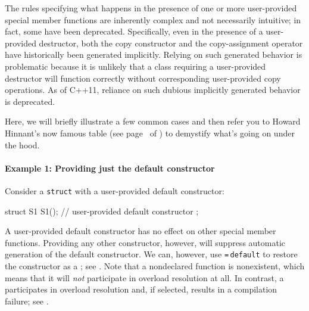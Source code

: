 The rules specifying what happens in the presence of one or more
user-provided special member functions are inherently complex and not
necessarily intuitive; in fact, some have been
deprecated. Specifically, even in the presence of a user-provided
destructor, both the copy constructor and the copy-assignment operator
have historically been generated implicitly. Relying on such generated
behavior is problematic because it is unlikely that a class
requiring a user-provided destructor will function correctly without
corresponding user-provided copy operations. As of C++11, reliance on
  such dubious implicitly generated behavior is deprecated.

Here, we
will briefly illustrate a few common cases and then refer you to Howard
Hinnant's now famous table (see page~\pageref{default-table1} of )
to
demystify what's going on under the hood.

\paragraph[Example 1: Providing just the default constructor]{Example 1: Providing just the default constructor}\label{example-1:-providing-just-the-default-constructor}

Consider a \lstinline!struct! with a user-provided default constructor:

\begin{emcppslisting}
struct S1
{
    S1();  // user-provided default constructor
};
\end{emcppslisting}

\noindent A user-provided default constructor has no effect on other special
member functions. Providing any other constructor, however, will
suppress automatic generation of the default constructor. We can, however, use
\lstinline!=!\,\lstinline!default! to restore the constructor as a ; see .
Note that a nondeclared
function is nonexistent, which means that it will \emph{not}
participate in overload resolution at all. In contrast, a
 participates in overload resolution and, if
selected, results in a compilation failure; see .

